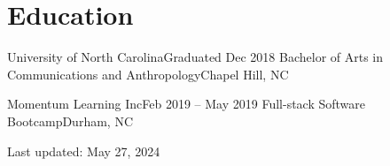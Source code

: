 \section{Education}
    \resumeSubHeadingListStart

    \resumeSubheading
    {University of North Carolina}{Graduated Dec 2018}
    {Bachelor of Arts in Communications and Anthropology}{Chapel Hill, NC}
      \vspace{2.2pt}

    \resumeSubheading
    {Momentum Learning Inc}{Feb 2019 -- May 2019}
    {Full-stack Software Bootcamp}{Durham, NC}

    \vspace{3em}
    \begin{center} 
    Last updated: May 27, 2024 
    \end{center} 
    \resumeSubHeadingListEnd

